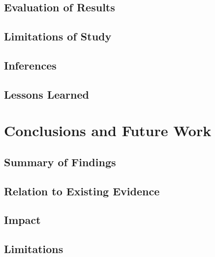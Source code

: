 \documentclass[conference,compsoc]{IEEEtran}
\begin{document}
\hypertarget{evaluation-of-results}{%
\subsection{Evaluation of Results}\label{evaluation-of-results}}

\hypertarget{limitations-of-study}{%
\subsection{Limitations of Study}\label{limitations-of-study}}

\hypertarget{inferences}{%
\subsection{Inferences}\label{inferences}}

\hypertarget{lessons-learned}{%
\subsection{Lessons Learned}\label{lessons-learned}}

\hypertarget{conclusions-and-future-work}{%
\section{Conclusions and Future
Work}\label{conclusions-and-future-work}}

\hypertarget{summary-of-findings}{%
\subsection{Summary of Findings}\label{summary-of-findings}}

\hypertarget{relation-to-existing-evidence}{%
\subsection{Relation to Existing
Evidence}\label{relation-to-existing-evidence}}

\hypertarget{impact}{%
\subsection{Impact}\label{impact}}

\hypertarget{limitations}{%
\subsection{Limitations}\label{limitations}}
\end{document}
